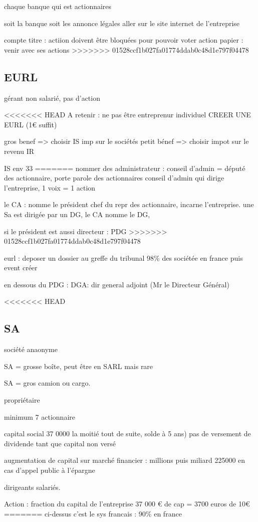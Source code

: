 \documentclass[a4paper,12pt]{article}
\begin{document}
chaque banque qui est actionnaires

soit la banque
soit les annonce légales
aller sur le site internet de l'entreprise

compte titre : actiion doivent être bloquées pour pouvoir voter
action papier : venir avec ses actions
>>>>>>> 01528ccf1b027fa01774ddab0c48d1e797f04478

\subsection{EURL}
gérant non salarié, pas d'action

<<<<<<< HEAD
A retenir : ne pas être entreprenur individuel CREER UNE EURL  (1€ suffit)

gros benef => choisir IS imp sur le sociétés
petit bénef => choisir impot sur le revenu IR

IS env 33%
=======
nommer des administrateur : conseil d'admin  = député des actionnaire, porte parole des actionnaires
conseil d'admin qui dirige l'entreprise, 1 voix = 1 action

le CA : nomme le président chef du repr des actionnaire, incarne l'entreprise.
une Sa est dirigée par un DG, le CA nomme le DG, 

si le président est aussi directeur : PDG
>>>>>>> 01528ccf1b027fa01774ddab0c48d1e797f04478

eurl : deposer un dossier au greffe du tribunal
98\% des sociétée en france
puis event créer

en dessous du PDG : DGA: dir general adjoint (Mr le Directeur Général)

<<<<<<< HEAD
\subsection{SA} société anaonyme

SA = grosse boîte, peut être en SARL mais rare

SA = gros camion ou cargo.

propriétaire

minimum 7 actionnaire

capital social 37 0000
la moitié tout de suite, solde à 5 ans) pas de versement de dividende tant que capital non versé

augmentation de capital sur marché financier : millions puis miliard
225000 en cas d'appel public à l'épargne

dirigeants salariés.

Action : fraction du capital de l'entreprise 37 000 € de cap = 3700 euros de 10€
=======
ci-dessus c'est le sys francais : 90\% en france
\end{document}
